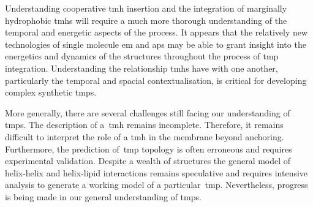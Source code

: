 Understanding cooperative \gls{tmh} insertion and the integration of marginally hydrophobic \gls{tmh}s will require a much more thorough understanding of the temporal and energetic aspects of the process.
It appears that the relatively new technologies of single molecule \gls{em} and \gls{ap}s may be able to grant insight into the energetics and dynamics of the structures throughout the process of \gls{tmp} integration.
Understanding the relationship \gls{tmh}s have with one another, particularly the temporal and spacial contextualisation, is critical for developing complex synthetic \gls{tmp}s.

More generally, there are several challenges still facing our understanding of \gls{tmp}s.
The description of a~\gls{tmh} remains incomplete.
Therefore, it remains difficult to interpret the role of a \gls{tmh} in the membrane beyond anchoring.
Furthermore, the prediction of~\gls{tmp} topology is often erroneous and requires experimental validation.
Despite a wealth of structures the general model of helix\--helix and helix\--lipid interactions remains speculative and requires intensive analysis to generate a working model of a particular~\gls{tmp}.
Nevertheless, progress is being made in our general understanding of \gls{tmp}s.
